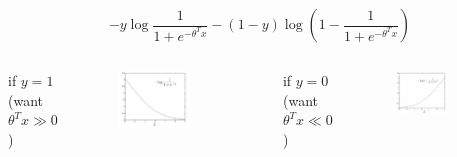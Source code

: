 \documentclass[9pt,dvipsnames]{beamer}
\begin{document}
\begin{frame}
	\[
		-y \log \frac{1}{1+e^{-\theta^T x}}-(1-y) \log \left(1-\frac{1}{1+e^{-\theta^T x}}\right)
	\]
	\begin{columns}
		if \(y=1\) (want $\theta^T x \gg 0$)
		\begin{figure}
			\centering
			\includegraphics[width=0.7\textwidth]{imgs/svm_2.png}
		\end{figure}
		if \(y=0\) (want $\theta^T x \ll 0$)
		\begin{figure}
			\centering
			\includegraphics[width=0.7\textwidth]{imgs/svm_3.png}
		\end{figure}
	\end{columns}
\end{frame}
\end{document}
